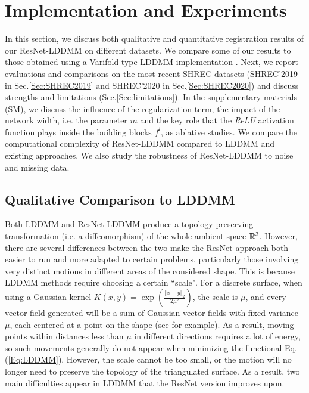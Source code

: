 \section{Implementation and Experiments}
\label{sec:Experiments}

In this section, we discuss both qualitative and quantitative registration results of our ResNet-LDDMM on different datasets. We compare some of our results to those obtained using a Varifold-type LDDMM implementation \cite{charon2013varifold}. Next, we report evaluations and comparisons on the most recent SHREC datasets (SHREC'2019 in Sec.\ref{Sec:SHREC2019} and SHREC'2020 in Sec.\ref{Sec:SHREC2020}) and discuss strengths and limitations (Sec.\ref{Sec:limitations}). In the supplementary materials (SM), we discuss the influence of the regularization term, the impact of the network width, i.e. the parameter $m$ and the key role that the \textit{ReLU} activation function plays inside the building blocks $f^l$, as ablative studies. We compare the computational complexity of ResNet-LDDMM compared to LDDMM and existing approaches.  We also study the robustness of ResNet-LDDMM to noise and missing data.         

\subsection{Qualitative Comparison to LDDMM}
\label{sec:LDDMMcomparison}

Both LDDMM and ResNet-LDDMM produce a topology-preserving transformation (i.e. a diffeomorphism) of the whole ambient space $\mathbb{R}^3$. However, there are several differences between the two make the ResNet approach both easier to run and more adapted to certain problems, particularly those involving very distinct motions in different areas of the considered shape. This is because LDDMM methods require choosing a certain ``scale". For a discrete surface, when using a Gaussian kernel $K(x,y)=\exp(\frac{\Vert x-y\Vert_2}{2\mu^2})$, the scale is $\mu$, and every vector field generated will be a sum of Gaussian vector fields with fixed variance $\mu$, each centered at a point on the shape (see \cite{arguillere2016multipleshapes} for example). As a result, moving points within distances less than $\mu$ in different directions requires a lot of energy, so such movements generally do not appear when minimizing the functional Eq. (\ref{Eq:LDDMM}). However, the scale cannot be too small, or the motion will no longer need to preserve the topology of the triangulated surface. As a result, two main difficulties appear in LDDMM that the ResNet version improves upon. 

